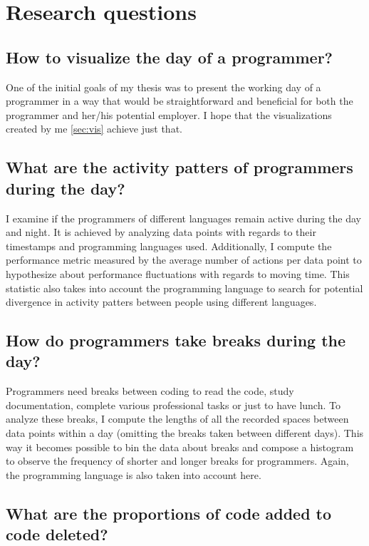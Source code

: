 \section{Research questions}

\subsection{How to visualize the day of a programmer?}

One of the initial goals of my thesis was to present the working day of a programmer in a way that would be straightforward and beneficial for both the programmer and her/his potential employer. I hope that the visualizations created by me \ref{sec:vis} achieve just that.

\subsection{What are the activity patters of programmers during the day?}

I examine if the programmers of different languages remain active during the day and night. It is achieved by analyzing data points with regards to their timestamps and programming languages used. Additionally, I compute the performance metric measured by the average number of actions per data point to hypothesize about performance fluctuations with regards to moving time. This statistic also takes into account the programming language to search for potential divergence in activity patters between people using different languages.

\subsection{How do programmers take breaks during the day?}

Programmers need breaks between coding to read the code, study documentation, complete various professional tasks or just to have lunch. To analyze these breaks, I compute the lengths of all the recorded spaces between data points within a day (omitting the breaks taken between different days). This way it becomes possible to bin the data about breaks and compose a histogram to observe the frequency of shorter and longer breaks for programmers. Again, the programming language is also taken into account here.

\subsection{What are the proportions of code added to code deleted?}

